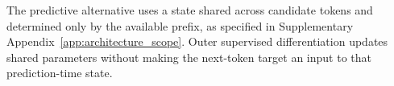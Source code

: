 \documentclass[twoside,11pt]{article}
\begin{document}
The predictive alternative uses a state shared across candidate tokens and determined only by the available prefix, as specified in Supplementary Appendix~\ref{app:architecture_scope}. Outer supervised differentiation updates shared parameters without making the next-token target an input to that prediction-time state.


\end{document}
